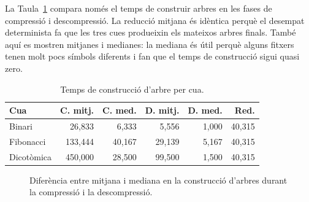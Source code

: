 \documentclass[conference,compsoc]{IEEEtran}
\begin{document}
La Taula~\ref{tab:queueavg} compara només el temps de construir arbres en les fases
de compressió i descompressió.
La reducció mitjana és idèntica perquè el desempat determinista fa que les
tres cues produeixin els mateixos arbres finals. També aquí es mostren
mitjanes i medianes: la mediana és útil perquè alguns fitxers tenen molt
pocs símbols diferents i fan que el temps de construcció sigui quasi zero.

\begin{table}[!b]
\centering
\caption{Temps de construcció d'arbre per cua.}
\label{tab:queueavg}
\scriptsize
\begin{tabular}{@{}lrrrrr@{}}
\toprule
\textbf{Cua} & \textbf{C. mitj.} & \textbf{C. med.} & \textbf{D. mitj.} & \textbf{D. med.} & \textbf{Red.} \\
\midrule
Binari & 26,833 & 6,333 & 5,556 & 1,000 & 40,315 \\
Fibonacci & 133,444 & 40,167 & 29,139 & 5,167 & 40,315 \\
Dicotòmica & 450,000 & 28,500 & 99,500 & 1,500 & 40,315 \\
\bottomrule
\end{tabular}
\end{table}

\begin{figure}[t]
    \centering
    \queuestatsdata
    \caption{Diferència entre mitjana i mediana en la construcció d'arbres durant la compressió i la descompressió.}
    \label{fig:queue_mean_median}
\end{figure}
\end{document}
